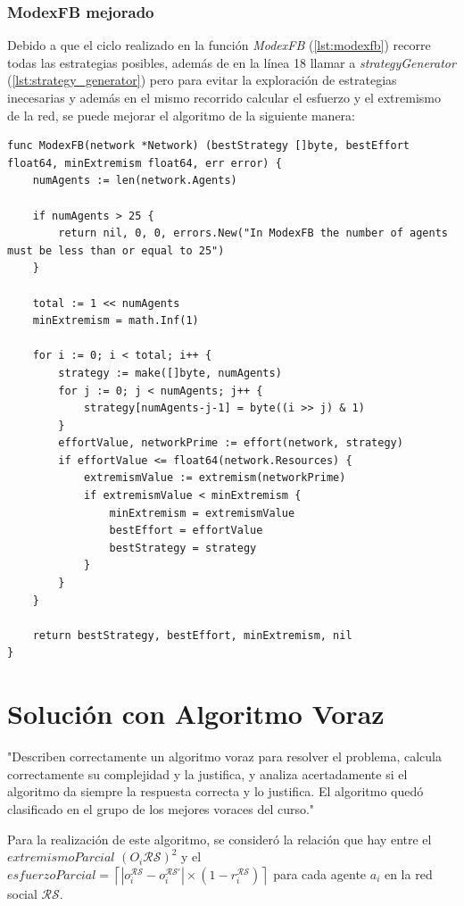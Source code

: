 \documentclass[letterpaper,10pt]{article}
\begin{document}
\subsubsection*{ModexFB mejorado}

Debido a que el ciclo realizado en la función \textit{ModexFB} (\ref{lst:modexfb}) recorre todas las estrategias posibles, además de en la línea 18 llamar a \textit{strategyGenerator} (\ref{lst:strategy_generator}) pero para evitar la exploración de estrategias inecesarias y además en el mismo recorrido calcular el esfuerzo y el extremismo de la red, se puede mejorar el algoritmo de la siguiente manera:
\begin{lstlisting}[caption={ModexFB mejorado}, label={lst:modexfb_mejorado}]
func ModexFB(network *Network) (bestStrategy []byte, bestEffort float64, minExtremism float64, err error) {
	numAgents := len(network.Agents)

	if numAgents > 25 {
		return nil, 0, 0, errors.New("In ModexFB the number of agents must be less than or equal to 25")
	}

	total := 1 << numAgents
	minExtremism = math.Inf(1)

	for i := 0; i < total; i++ {
		strategy := make([]byte, numAgents)
		for j := 0; j < numAgents; j++ {
			strategy[numAgents-j-1] = byte((i >> j) & 1)
		}
		effortValue, networkPrime := effort(network, strategy)
		if effortValue <= float64(network.Resources) {
			extremismValue := extremism(networkPrime)
			if extremismValue < minExtremism {
				minExtremism = extremismValue
				bestEffort = effortValue
				bestStrategy = strategy
			}
		}
	}

	return bestStrategy, bestEffort, minExtremism, nil
}
\end{lstlisting}
\section{Solución con Algoritmo Voraz}
\label{sec:algoritmo_voraz}
"Describen correctamente un algoritmo voraz para resolver el problema, calcula correctamente su complejidad y la justifica, y analiza acertadamente si el algoritmo da siempre la respuesta correcta y lo justifica. El algoritmo quedó clasificado en el grupo de los mejores voraces del curso."

Para la realización de este algoritmo, se consideró la relación que hay entre el $extremismoParcial$ $(O_i\mathcal{R} \mathcal{S})^2$ y el $esfuerzoParcial = \left\lceil  |o_i^{\mathcal{R}\mathcal{S}} - o_i^{\mathcal{R}\mathcal{S}'}| \times (1 - r_i^{\mathcal{R}\mathcal{S}}) \right\rceil$ para cada agente $a_i$ en la red social $\mathcal{R}\mathcal{S}$.
\end{document}
